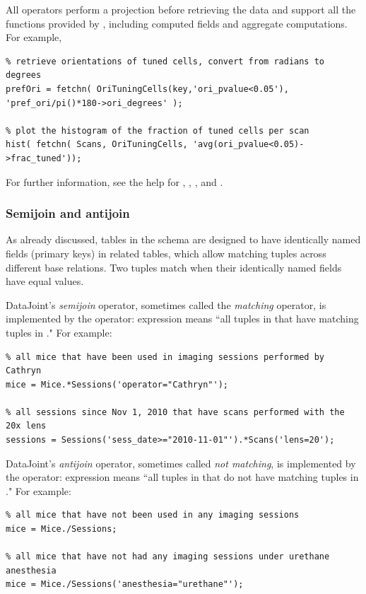 \documentclass[10pt]{article}
\begin{document}
All  operators perform a projection before retrieving the data and support all the functions provided by , including computed fields and aggregate computations.  For example, 
\begin{lstlisting}
% retrieve orientations of tuned cells, convert from radians to degrees
prefOri = fetchn( OriTuningCells(key,'ori_pvalue<0.05'), 'pref_ori/pi()*180->ori_degrees' ); 

% plot the histogram of the fraction of tuned cells per scan
hist( fetchn( Scans, OriTuningCells, 'avg(ori_pvalue<0.05)->frac_tuned'));  
\end{lstlisting}

For further information, see the help for , , , and .

\subsubsection{Semijoin and antijoin}
As already discussed, tables in the schema are designed to have identically named fields (primary keys) in related tables, which allow matching tuples across different base relations.  Two tuples match when their identically named fields have equal values.

DataJoint's {\em semijoin} operator, sometimes called the {\em matching} operator,  is implemented by the  operator:  expression  means ``all tuples in  that have matching tuples in ." For example:
\begin{lstlisting}
% all mice that have been used in imaging sessions performed by Cathryn
mice = Mice.*Sessions('operator="Cathryn"');  

% all sessions since Nov 1, 2010 that have scans performed with the 20x lens
sessions = Sessions('sess_date>="2010-11-01"').*Scans('lens=20');
\end{lstlisting}

DataJoint's {\em antijoin} operator, sometimes called {\em not matching}, is implemented by the  operator: expression  means ``all tuples in  that do not have matching tuples in ." For example:

\begin{lstlisting}
% all mice that have not been used in any imaging sessions
mice = Mice./Sessions;

% all mice that have not had any imaging sessions under urethane anesthesia
mice = Mice./Sessions('anesthesia="urethane"');  
\end{lstlisting}
\end{document}
